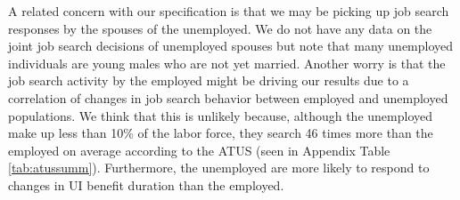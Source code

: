 \documentclass[12pt]{article}
\begin{document}
\begin{spacing}{2}
\begin{appendix}
\begin{spacing}{2}
A related concern with our specification is that we may be picking up job search responses by the spouses of the unemployed. We do not have any data on the joint job search decisions of unemployed spouses but note that many unemployed individuals are young males who are not yet married. Another worry is that the job search activity by the employed might be driving our results due to a correlation of changes in job search behavior between employed and unemployed populations. We think that this is unlikely because, although the unemployed make up less than 10\% of the labor force, they search 46 times more than the employed on average according to the ATUS (seen in Appendix Table \ref{tab:atussumm}). Furthermore, the unemployed are more likely to respond to changes in UI benefit duration than the employed. 
\end{spacing}



\end{appendix}
\end{spacing}
\end{document}

